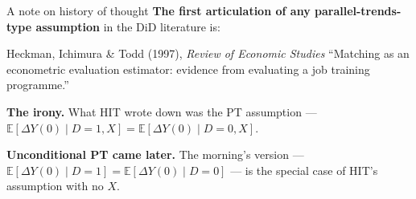 \documentclass[aspectratio=169,11pt]{beamer}
\begin{document}
\begin{frame}{A note on history of thought}
\footnotesize
\textbf{The first articulation of any parallel-trends-type assumption} in the DiD literature is:
\begin{block}{Heckman, Ichimura \& Todd (1997), \textit{Review of Economic Studies}}
\small
``Matching as an econometric evaluation estimator: evidence from evaluating a job training programme.''
\end{block}

\vspace{0.4em}
\textbf{The irony.} What HIT wrote down was the  PT assumption ---
$\mathbb{E}[\Delta Y(0) \mid D{=}1, X] = \mathbb{E}[\Delta Y(0) \mid D{=}0, X]$.

\vspace{0.5em}
\textbf{Unconditional PT came later.} \;The morning's version --- $\mathbb{E}[\Delta Y(0) \mid D{=}1] = \mathbb{E}[\Delta Y(0) \mid D{=}0]$ --- is the special case of HIT's assumption with no $X$.

\vspace{0.5em}
\end{frame}
\end{document}
